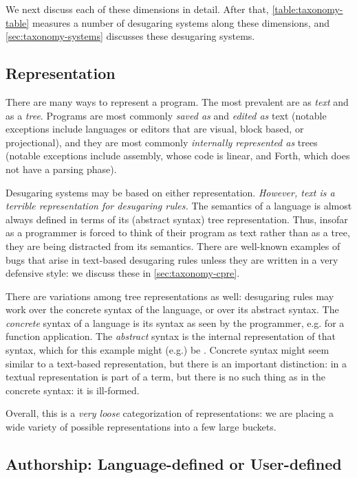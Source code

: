We next discuss each of these dimensions in detail. After that,
\cref{table:taxonomy-table} measures a number of desugaring systems
along these dimensions, and \cref{sec:taxonomy-systems} discusses
these desugaring systems.

\subsection{Representation}

There are many ways to represent a program. The most prevalent are as
\emph{text} and as a \emph{tree}. Programs are most commonly
\emph{saved as} and \emph{edited as} text (notable exceptions include
languages or editors that are visual, block based, or projectional),
and they are most commonly
\emph{internally represented as} trees (notable exceptions include
assembly, whose code is linear, and Forth, which does not have a
parsing phase).

Desugaring systems may be based on either representation.
\emph{However, text is a terrible representation for desugaring rules.}
The semantics of a language is almost always defined in terms of its
(abstract syntax) tree representation. Thus, insofar as a programmer
is forced to think of their program as text rather
than as a tree, they are being distracted from its semantics. There
are well-known examples of bugs that arise in text-based desugaring
rules unless they are written in a very defensive style: we discuss
these in \ref{sec:taxonomy-cpre}.

There are variations among tree representations as well: desugaring
rules may work over the concrete syntax of the language, or over its
abstract syntax. The \emph{concrete} syntax of a language is its
syntax as seen by the programmer, e.g.  for a function
application. The \emph{abstract} syntax is the internal representation
of that syntax, which for this example might (e.g.) be
. Concrete syntax might seem similar to a
text-based representation, but there is an important distinction:
 in a textual representation is part of a term, but
there is no such thing as  in the concrete syntax: it is
ill-formed.

Overall, this is a \emph{very loose} categorization of
representations: we are placing a wide variety of possible
representations into a few large buckets.


\subsection{Authorship: Language-defined or User-defined}

